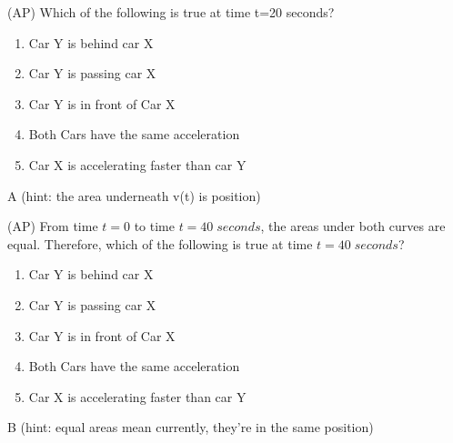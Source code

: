 
\begin{question}
(AP) Which of the following is true at time t=20 seconds?
\begin{enumerate}[label=(\alph*)]
    \item Car Y is behind car X
    \item Car Y is passing car X
    \item Car Y is in front of Car X
    \item Both Cars have the same acceleration
    \item Car X is accelerating faster than car Y
\end{enumerate}
\end{question}

\begin{solution}
A (hint: the area underneath v(t) is position)
\end{solution}

\newpage
\begin{question}
(AP) From time $t=0$ to time $t=40\;seconds$, the areas under both curves are equal. Therefore, which of the following is true at time $t=40\;seconds$?
\begin{enumerate}[label=(\alph*)]
    \item Car Y is behind car X
    \item Car Y is passing car X
    \item Car Y is in front of Car X
    \item Both Cars have the same acceleration
    \item Car X is accelerating faster than car Y
\end{enumerate}
\end{question}

\begin{solution}
B (hint: equal areas mean currently, they're in the same position)
\end{solution}


